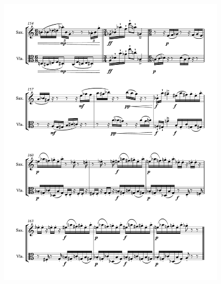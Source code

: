 \begin{figure}[htbp]
    \centering
	\includegraphics[width=6.5in]{figures/Sax_Viola_14.pdf}
\end{figure}

